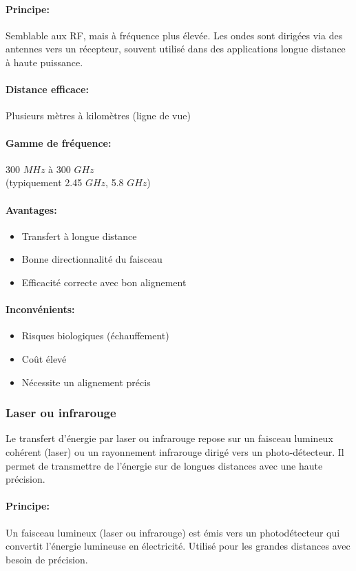 \documentclass[12pt,a4paper,titlepage,notitlepage]{article}
\begin{document}
	\paragraph{Principe: \\}
	Semblable aux RF, mais à fréquence plus élevée. Les ondes sont dirigées via des antennes vers un récepteur, souvent utilisé dans des applications longue distance à haute puissance.
	\paragraph{Distance efficace: \\}
	Plusieurs mètres à kilomètres (ligne de vue)
	\paragraph{Gamme de fréquence: \\}
	300 $MHz$ à 300 $GHz$ \\ (typiquement 2.45 $GHz$, 5.8 $GHz$)
	\paragraph{Avantages: }
	\begin{itemize}
		\item Transfert à longue distance
		\item Bonne directionnalité du faisceau
		\item Efficacité correcte avec bon alignement
	\end{itemize}
	\paragraph{Inconvénients: }
	\begin{itemize}
		\item Risques biologiques (échauffement)
		\item Coût élevé
		\item Nécessite un alignement précis
	\end{itemize} 

	\subsubsection{Laser ou infrarouge}
	Le transfert d’énergie par laser ou infrarouge repose sur un faisceau lumineux cohérent (laser) ou un rayonnement infrarouge dirigé vers un photo-détecteur. Il permet de transmettre de l’énergie sur de longues distances avec une haute précision.
	\paragraph{Principe: \\}
	Un faisceau lumineux (laser ou infrarouge) est émis vers un photodétecteur qui convertit l’énergie lumineuse en électricité. Utilisé pour les grandes distances avec besoin de précision.
\end{document}
